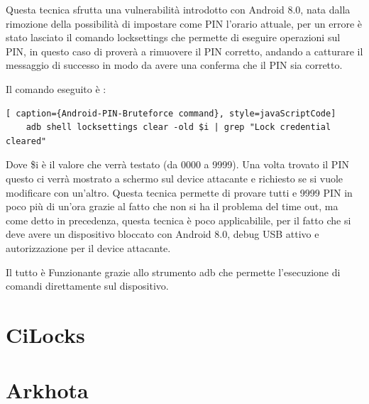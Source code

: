 Questa tecnica sfrutta una vulnerabilità introdotto con Android 8.0, nata dalla rimozione della possibilità di impostare come PIN l’orario attuale, per un errore è stato lasciato il comando locksettings che permette di eseguire operazioni sul PIN, in questo caso di proverà a rimuovere il PIN corretto, andando a catturare il messaggio di successo in modo da avere una conferma che il PIN sia corretto.

Il comando eseguito è :

\begin{lstlisting}[ caption={Android-PIN-Bruteforce command}, style=javaScriptCode]
	adb shell locksettings clear -old $i | grep "Lock credential cleared"
\end{lstlisting}

Dove \$i è il valore che verrà testato (da 0000 a 9999). Una volta trovato il PIN questo ci verrà mostrato a schermo sul device attacante e richiesto se si vuole modificare con un’altro. Questa tecnica permette di provare tutti e 9999 PIN in poco più di un’ora grazie al fatto che non si ha il problema del time out, ma come detto in precedenza, questa tecnica è poco applicabilile, per il fatto che si deve avere un dispositivo bloccato con Android 8.0, debug USB attivo e autorizzazione per il device attacante.

Il tutto è Funzionante grazie allo strumento adb\cite{adb} che permette l’esecuzione di comandi direttamente sul dispositivo.


\section{CiLocks}

\section{Arkhota}



